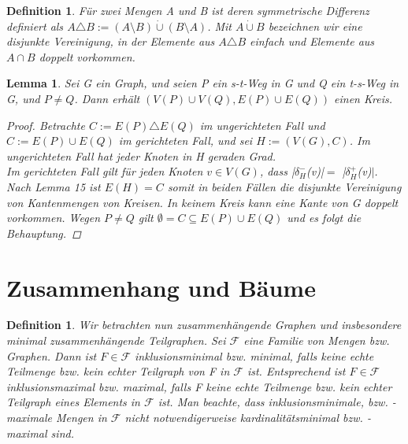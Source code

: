 \documentclass{beamer}
\newtheorem{defi}[satz]{Definition}
\newtheorem{lem}[satz]{Lemma}
\begin{document}
  \begin{frame}
  \vfill
    \begin{center}
      \begin{defi}
        Für zwei Mengen A und B ist deren symmetrische Differenz definiert als $A\triangle B:= (A\setminus B) \dot\cup (B\setminus A)$.
        Mit $A\dot\cup B$ bezeichnen wir eine disjunkte Vereinigung, in der Elemente aus $A\triangle B$ einfach und Elemente aus $A \cap B$ doppelt vorkommen.
      \end{defi}
    \end{center}
  \vfill
  \end{frame}

  \begin{frame}
  \vfill
    \begin{center}
      \begin{lem}
        Sei G ein Graph, und seien P ein s-t-Weg in G und Q ein t-s-Weg in G, und $P\neq Q$.
        Dann erhält $(V(P)\cup V(Q), E(P) \cup E(Q))$ einen Kreis.
       \begin{proof}
         Betrachte $C:=E(P)\triangle E(Q)$ im ungerichteten Fall und $C:=E(P)\cup E(Q)$ im gerichteten Fall, und sei $H:= (V(G),C)$.
         Im ungerichteten Fall hat jeder Knoten in H geraden Grad.\\
          Im gerichteten Fall gilt für jeden Knoten $v\in V(G)$, dass |$\delta^-_H$(v)|$ =$ |$\delta^+_H$(v)$|$.
          Nach Lemma 15 ist $E(H)= C$ somit in beiden Fällen die disjunkte Vereinigung von Kantenmengen von Kreisen.
          In keinem Kreis kann eine Kante von G doppelt vorkommen.
         Wegen $P\neq Q$ gilt $\emptyset= C\subseteq E(P)\cup E(Q)$ und es folgt die Behauptung.
        \end{proof}
      \end{lem}
    \end{center}
  \vfill
  \end{frame}

\section{Zusammenhang und Bäume}

  \begin{frame}
  \vfill
    \begin{center}
      \begin{defi} 
        Wir betrachten nun zusammenhängende Graphen und insbesondere minimal zusammenhängende Teilgraphen.
        Sei $\mathcal{F}$ eine Familie von Mengen bzw. Graphen. 
        Dann ist $F \in\mathcal{F}$ inklusionsminimal bzw. minimal, falls keine echte Teilmenge bzw. kein echter Teilgraph von F in $\mathcal{F}$ ist.
        Entsprechend ist $F \in \mathcal{F}$ inklusionsmaximal bzw. maximal, falls F keine echte Teilmenge bzw. kein echter Teilgraph eines Elements in $\mathcal{F}$ ist.
        Man beachte, dass inklusionsminimale, bzw. -maximale Mengen in $\mathcal{F}$ nicht notwendigerweise kardinalitätsminimal bzw. -maximal sind.
      \end{defi}
    \end{center}
  \vfill
  \end{frame}
\end{document}
